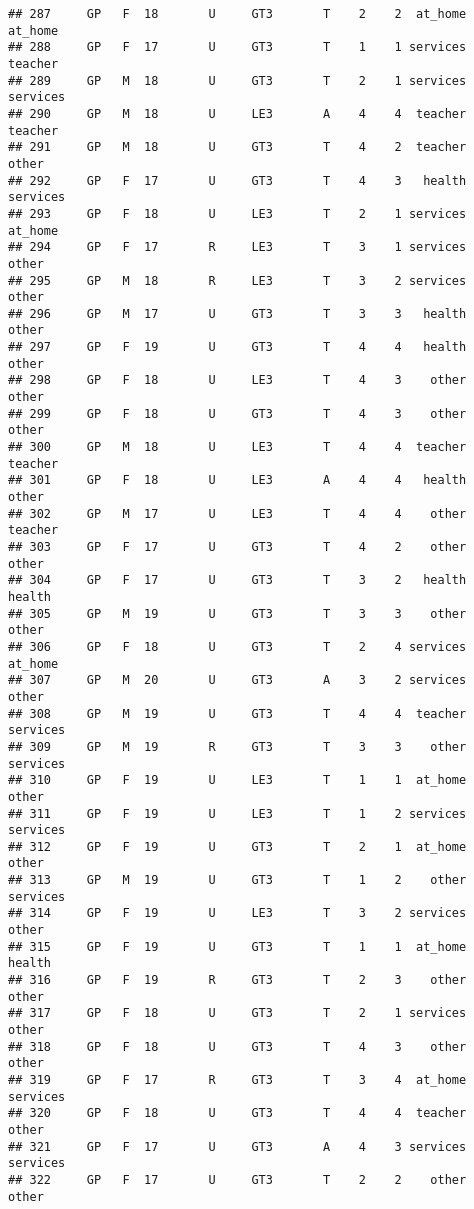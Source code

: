 \documentclass[
]{article}
\begin{document}
\begin{verbatim}
## 287     GP   F  18       U     GT3       T    2    2  at_home  at_home
## 288     GP   F  17       U     GT3       T    1    1 services  teacher
## 289     GP   M  18       U     GT3       T    2    1 services services
## 290     GP   M  18       U     LE3       A    4    4  teacher  teacher
## 291     GP   M  18       U     GT3       T    4    2  teacher    other
## 292     GP   F  17       U     GT3       T    4    3   health services
## 293     GP   F  18       U     LE3       T    2    1 services  at_home
## 294     GP   F  17       R     LE3       T    3    1 services    other
## 295     GP   M  18       R     LE3       T    3    2 services    other
## 296     GP   M  17       U     GT3       T    3    3   health    other
## 297     GP   F  19       U     GT3       T    4    4   health    other
## 298     GP   F  18       U     LE3       T    4    3    other    other
## 299     GP   F  18       U     GT3       T    4    3    other    other
## 300     GP   M  18       U     LE3       T    4    4  teacher  teacher
## 301     GP   F  18       U     LE3       A    4    4   health    other
## 302     GP   M  17       U     LE3       T    4    4    other  teacher
## 303     GP   F  17       U     GT3       T    4    2    other    other
## 304     GP   F  17       U     GT3       T    3    2   health   health
## 305     GP   M  19       U     GT3       T    3    3    other    other
## 306     GP   F  18       U     GT3       T    2    4 services  at_home
## 307     GP   M  20       U     GT3       A    3    2 services    other
## 308     GP   M  19       U     GT3       T    4    4  teacher services
## 309     GP   M  19       R     GT3       T    3    3    other services
## 310     GP   F  19       U     LE3       T    1    1  at_home    other
## 311     GP   F  19       U     LE3       T    1    2 services services
## 312     GP   F  19       U     GT3       T    2    1  at_home    other
## 313     GP   M  19       U     GT3       T    1    2    other services
## 314     GP   F  19       U     LE3       T    3    2 services    other
## 315     GP   F  19       U     GT3       T    1    1  at_home   health
## 316     GP   F  19       R     GT3       T    2    3    other    other
## 317     GP   F  18       U     GT3       T    2    1 services    other
## 318     GP   F  18       U     GT3       T    4    3    other    other
## 319     GP   F  17       R     GT3       T    3    4  at_home services
## 320     GP   F  18       U     GT3       T    4    4  teacher    other
## 321     GP   F  17       U     GT3       A    4    3 services services
## 322     GP   F  17       U     GT3       T    2    2    other    other

\end{verbatim}
\end{document}
